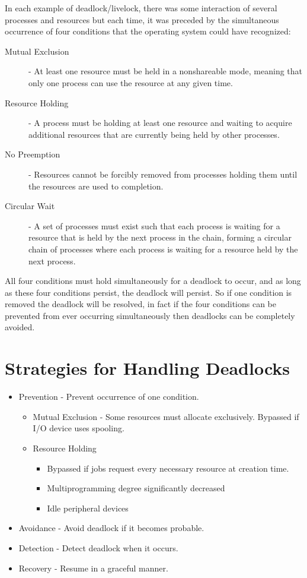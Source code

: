 \documentclass[12pt letter]{report}
\begin{document}
In each example of deadlock/livelock, there was some interaction of
several processes and resources but each time, it was preceded by the
simultaneous occurrence of four conditions that the operating system
could have recognized:
\begin{description}
  \item[Mutual Exclusion]  - At least one resource must be held in a
    nonshareable mode, meaning that only one process can use the
    resource at any given time.
  \item[Resource Holding]  - A process must be holding at least one
    resource and waiting to acquire additional resources that are
    currently being held by other processes.
  \item[No Preemption]  - Resources cannot be forcibly removed from
    processes holding them until the resources are used to
    completion.
  \item[Circular Wait]  - A set of processes must exist such that
    each process is waiting for a resource that is held by the next
    process in the chain, forming a circular chain of processes
    where each process is waiting for a resource held by the next
    process.
\end{description}

All four conditions must hold simultaneously for a deadlock to occur,
and as long as these four conditions persist, the deadlock will
persist. So if one condition is removed the deadlock will be
resolved, in fact if the four conditions can be prevented from ever
occurring simultaneously then deadlocks can be completely avoided.

\section{Strategies for Handling Deadlocks}
\begin{itemize}
  \item Prevention - Prevent occurrence of one condition.
    \begin{itemize}
      \item Mutual Exclusion - Some resources must allocate
        exclusively. Bypassed if I/O device uses spooling.
      \item  Resource Holding
        \begin{itemize}
          \item Bypassed if jobs request every necessary resource at
            creation time.
          \item  Multiprogramming degree significantly decreased
          \item  Idle peripheral devices
        \end{itemize}

    \end{itemize}
  \item  Avoidance - Avoid deadlock if it becomes probable.
  \item Detection - Detect deadlock when it occurs.
  \item  Recovery - Resume in a graceful manner.
\end{itemize}
\end{document}
